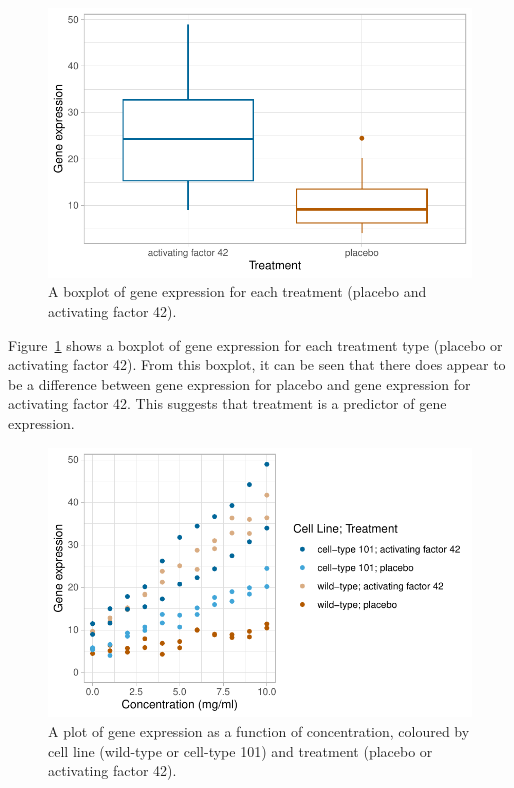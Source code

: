 \documentclass[
  letterpaper,
  DIV=11,
  numbers=noendperiod]{scrartcl}
\begin{document}
\begin{figure}

{\centering \includegraphics{2023-05-16_IMRaD-report_AStephenson_files/figure-pdf/fig-ge-treat-boxplot-1.pdf}

}

\caption{\label{fig-ge-treat-boxplot}A boxplot of gene expression for
each treatment (placebo and activating factor 42).}

\end{figure}

Figure~\ref{fig-ge-treat-boxplot} shows a boxplot of gene expression for
each treatment type (placebo or activating factor 42). From this
boxplot, it can be seen that there does appear to be a difference
between gene expression for placebo and gene expression for activating
factor 42. This suggests that treatment is a predictor of gene
expression.

\begin{figure}

{\centering \includegraphics{2023-05-16_IMRaD-report_AStephenson_files/figure-pdf/fig-ge-conc-grouping-1.pdf}

}

\caption{\label{fig-ge-conc-grouping}A plot of gene expression as a
function of concentration, coloured by cell line (wild-type or cell-type
101) and treatment (placebo or activating factor 42).}

\end{figure}
\end{document}
